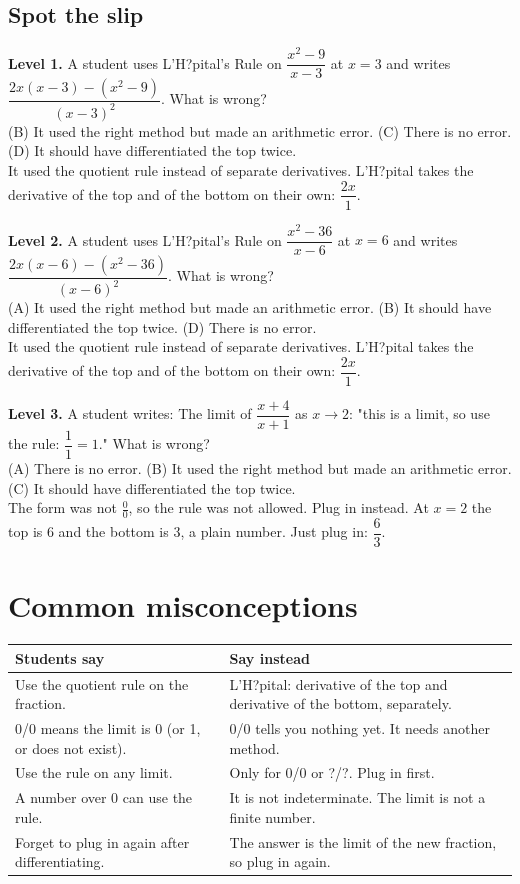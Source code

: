 \documentclass[11pt]{article}
\begin{document}
\subsection*{Spot the slip}
\noindent\textbf{Level 1.} A student uses L'H?pital's Rule on $\dfrac{x^2-9}{x-3}$ at $x=3$ and writes $\dfrac{2x(x-3)-(x^2-9)}{(x-3)^2}$. What is wrong?\\  \quad (B) It used the right method but made an arithmetic error. \quad (C) There is no error. \quad (D) It should have differentiated the top twice.\\  \quad It used the quotient rule instead of separate derivatives. L'H?pital takes the derivative of the top and of the bottom on their own: $\dfrac{2x}{1}$.\par\medskip
\noindent\textbf{Level 2.} A student uses L'H?pital's Rule on $\dfrac{x^2-36}{x-6}$ at $x=6$ and writes $\dfrac{2x(x-6)-(x^2-36)}{(x-6)^2}$. What is wrong?\\ (A) It used the right method but made an arithmetic error. \quad (B) It should have differentiated the top twice. \quad {} \quad (D) There is no error.\\  \quad It used the quotient rule instead of separate derivatives. L'H?pital takes the derivative of the top and of the bottom on their own: $\dfrac{2x}{1}$.\par\medskip
\noindent\textbf{Level 3.} A student writes: The limit of $\dfrac{x+4}{x+1}$ as $x\to2$: "this is a limit, so use the rule: $\dfrac11=1$." What is wrong?\\ (A) There is no error. \quad (B) It used the right method but made an arithmetic error. \quad (C) It should have differentiated the top twice. \quad {}\\  \quad The form was not $\frac00$, so the rule was not allowed. Plug in instead. At $x=2$ the top is 6 and the bottom is 3, a plain number. Just plug in: $\dfrac{6}{3}$.\par\medskip
\section*{Common misconceptions}\begin{tabularx}{\textwidth}{@{}X X@{}}\toprule Students say & Say instead\\\midrule
Use the quotient rule on the fraction. & L'H?pital: derivative of the top and derivative of the bottom, separately.\\
0/0 means the limit is 0 (or 1, or does not exist). & 0/0 tells you nothing yet. It needs another method.\\
Use the rule on any limit. & Only for 0/0 or ?/?. Plug in first.\\
A number over 0 can use the rule. & It is not indeterminate. The limit is not a finite number.\\
Forget to plug in again after differentiating. & The answer is the limit of the new fraction, so plug in again.\\
\bottomrule\end{tabularx}
\end{document}
